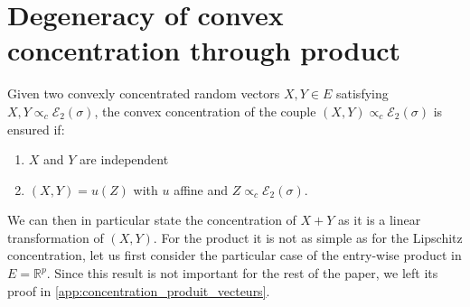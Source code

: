 \documentclass{ws-rmta}
\begin{document}
\section{Degeneracy of convex concentration through product}\label{sse:convex_concentration}


Given two convexly concentrated random vectors $X,Y \in E$ satisfying $X,Y \propto_c \mathcal E_2(\sigma)$, the convex concentration of the couple $(X,Y) \propto_c \mathcal E_2(\sigma)$ is ensured if:
\begin{enumerate}
  \item $X$ and $Y$ are independent
  \item $(X,Y) = u(Z)$ with $u$ affine and $Z\propto_c \mathcal E_2(\sigma)$.
\end{enumerate}
We can then in particular state the concentration of $X+Y$ as it is a linear transformation of $(X,Y)$. For the product it is not as simple as for the Lipschitz concentration, let us first consider the particular case of the entry-wise product in $E = \mathbb R^p$.
Since this result is not important for the rest of the paper, we left its proof in \ref{app:concentration_produit_vecteurs}.
\end{document}
